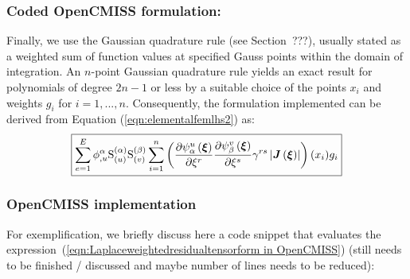 \subsubsection{Coded OpenCMISS formulation:}
Finally, we use the Gaussian quadrature rule (see Section~???), 
usually stated as a weighted sum of function values at specified Gauss points within the domain of integration. An $n$-point Gaussian quadrature rule yields an exact result for polynomials of degree $2n-1$ or less by a suitable choice of the points $x_i$ and weights $g_i$ for $i = 1,...,n$. Consequently, the formulation implemented can be derived from Equation (\ref{eqn:elementalfemlhs2}) as: 
\begin{equation}
  \boxed{
  \dsum_{e=1}^{E}\nodedof{\phi}{\alpha}{u}\gsf{(\alpha)}{(u)} \gsf{(\beta)}{(v)}
  \dsum_{i=1}^{n}
  \left(\delby{\gbfn{\alpha}{u}{\vect{\xi}}}{\xi^{r}}
  \delby{\gbfn{\beta}{v}{\vect{\xi}}}{\xi^{s}}\gamma^{rs}\abs{\fnof{\matr{J}}{\vect{\xi}}}
  \right)(x_i)g_i
  }
  \label{eqn:Laplaceweightedresidualtensorform in OpenCMISS}
\end{equation}


\newpage
\subsubsection{OpenCMISS implementation}

For exemplification, we briefly discuss here a code snippet
that evaluates the expression~(\ref{eqn:Laplaceweightedresidualtensorform in OpenCMISS})
(still needs to be finished / discussed and maybe number of lines needs to be reduced):

